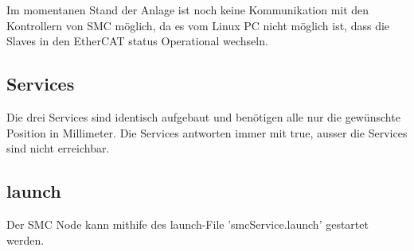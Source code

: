 Im momentanen Stand der Anlage ist noch keine Kommunikation mit den Kontrollern von SMC möglich, da es vom Linux PC nicht möglich ist, dass die Slaves in den EtherCAT status Operational wechseln. 

\subsection{Services} %
Die drei Services sind identisch aufgebaut und benötigen alle nur die gewünschte Position in Millimeter. Die Services antworten immer mit true, ausser die Services sind nicht erreichbar.

\subsection{launch}
Der SMC Node kann mithife des launch-File 'smcService.launch' gestartet werden.

